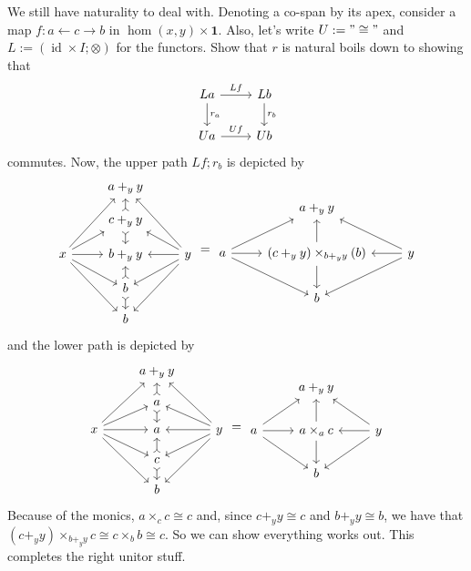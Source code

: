 \documentclass[12pt]{article}
\newcommand{\from}{\colon}
\renewcommand{\(}{\left(}
\renewcommand{\)}{\right)}
\renewcommand{\{}{\left\lbrace}
\renewcommand{\}}{\right\rbrace}
\DeclareMathOperator{\id}{id}
\theoremstyle{remark}
\theoremstyle{definition}
\begin{document}
We still have naturality to deal with.  Denoting a co-span by its apex, consider a map $f \from a \leftarrow c \to b$ in $\hom (x,y) \times \mathbf{1}$.  Also, let's write $U := "\cong"$ and $L := (\id \times I ; \otimes)$ for the functors.  Show that $r$ is natural boils down to showing that
\[
	\begin{tikzcd}
		{La} 
			\ar[r,"Lf"]
			\ar[d,"r_a"] &
		{Lb} 
			\ar[d,"r_b"] \\
		{Ua} 
			\ar[r, "Uf"] &
		{Ub} 
	\end{tikzcd}
\]
commutes. Now, the upper path $Lf ; r_b$ is depicted by
\[
	\begin{tikzcd}[row sep=1em]
		{} &
		{a +_yy} &
		{} \\
		{} &
		{c+_yy} 
			\ar[u,rightarrowtail]
			\ar[d,rightarrowtail] &
		{} \\
		{x} 
			\ar[ruu] 
			\ar[ru]
			\ar[r]
			\ar[rd]
			\ar[rdd]&
		{b+_yy} &
		{y} 
			\ar[luu]
			\ar[lu]
			\ar[l]
			\ar[ld]
			\ar[ldd] \\
		{} &
		{b} 
			\ar[u,rightarrowtail]
			\ar[d,rightarrowtail]&
		{} \\
		{} &
		{b} &
		{}
	\end{tikzcd}
	=
	\begin{tikzcd}
		{} &
		{a+_yy} &
		{} \\
		{a} 
			\ar[ru] 
			\ar[r]
			\ar[rd] &
		{(c+_yy) \times_{b+_yy} (b)}
			\ar[d]
			\ar[u] &
		{y} 
			\ar[lu] 
			\ar[l]
			\ar[ld] \\
		{} &
		{b} &
		{} 
	\end{tikzcd}
\]
and the lower path is depicted by 
\[
	\begin{tikzcd}[row sep=1em]
		{} &
		{a +_yy} &
		{} \\
		{} &
		{a} 
			\ar[u,rightarrowtail]
			\ar[d,rightarrowtail] &
		{} \\
		{x} 
			\ar[ruu] 
			\ar[ru]
			\ar[r]
			\ar[rd]
			\ar[rdd]&
		{a} &
		{y} 
			\ar[luu]
			\ar[lu]
			\ar[l]
			\ar[ld]
			\ar[ldd] \\
		{} &
		{c} 
			\ar[u,rightarrowtail]
			\ar[d,rightarrowtail]&
		{} \\
		{} &
		{b} &
		{}
	\end{tikzcd}
	=
	\begin{tikzcd}
		{} &
		{a+_yy} &
		{} \\
		{a} 
			\ar[ru] 
			\ar[r]
			\ar[rd] &
		{a \times_{a} c}
			\ar[d]
			\ar[u] &
		{y} 
			\ar[lu] 
			\ar[l]
			\ar[ld] \\
		{} &
		{b} &
		{} 
	\end{tikzcd}
\]
Because of the monics, $a \times_c c \cong c$ and, since $c+_yy \cong c$ and $b+_yy \cong b$, we have that $(c+_yy) \times_{b+_yy} c \cong c \times_b b \cong c$.  So we can show everything works out.  This completes the right unitor stuff.
\end{document}
